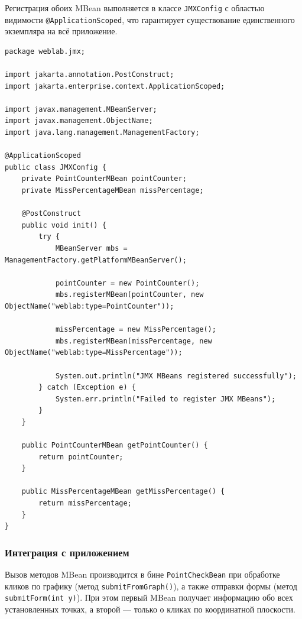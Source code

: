 Регистрация обоих MBean выполняется в классе \texttt{JMXConfig} с областью видимости \texttt{@ApplicationScoped}, что гарантирует существование единственного экземпляра на всё приложение.

\begin{lstlisting}[caption=Регистрация \texttt{MBean}.]
package weblab.jmx;

import jakarta.annotation.PostConstruct;
import jakarta.enterprise.context.ApplicationScoped;

import javax.management.MBeanServer;
import javax.management.ObjectName;
import java.lang.management.ManagementFactory;

@ApplicationScoped
public class JMXConfig {
    private PointCounterMBean pointCounter;
    private MissPercentageMBean missPercentage;

    @PostConstruct
    public void init() {
        try {
            MBeanServer mbs = ManagementFactory.getPlatformMBeanServer();

            pointCounter = new PointCounter();
            mbs.registerMBean(pointCounter, new ObjectName("weblab:type=PointCounter"));

            missPercentage = new MissPercentage();
            mbs.registerMBean(missPercentage, new ObjectName("weblab:type=MissPercentage"));

            System.out.println("JMX MBeans registered successfully");
        } catch (Exception e) {
            System.err.println("Failed to register JMX MBeans");
        }
    }

    public PointCounterMBean getPointCounter() {
        return pointCounter;
    }

    public MissPercentageMBean getMissPercentage() {
        return missPercentage;
    }
}
\end{lstlisting}

\subsubsection{Интеграция с приложением}

Вызов методов MBean производится в бине \texttt{PointCheckBean} при обработке кликов по графику (метод \texttt{submitFromGraph()}), а также отправки формы (метод \texttt{submitForm(int y)}). При этом первый MBean получает информацию обо всех установленных точках, а второй — только о кликах по координатной плоскости.


